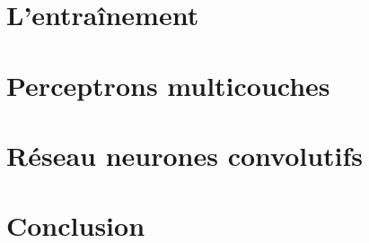 \documentclass[11pt,titlepage]{report}
\begin{document}
\chapter{L'entraînement}


\chapter{Perceptrons multicouches}


\chapter{Réseau neurones convolutifs}


\chapter{Conclusion}


\clearpage
\pagestyle{numberonly}

\printbibliography
\end{document}
